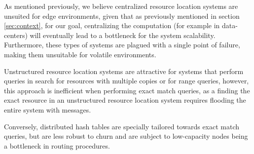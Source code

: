 As mentioned previously, we believe centralized resource location systems are unsuited for edge environments, given that as previously mentioned in section \ref{sec:context}, for our goal, centralizing the computation (for example in data-centers) will eventually lead to a bottleneck for the system scalability. Furthermore, these types of systems are plagued with a single point of failure, making them unsuitable for volatile environments. 

Unstructured resource location systems are attractive for systems that perform queries in search for resources with multiple copies or for range queries, however, this approach is inefficient when performing exact match queries, as a finding the exact resource in an unstructured resource location system requires flooding the entire system with messages.

Conversely, distributed hash tables are specially tailored towards exact match queries, but are less robust to churn and are subject to low-capacity nodes being a bottleneck in routing procedures. 










